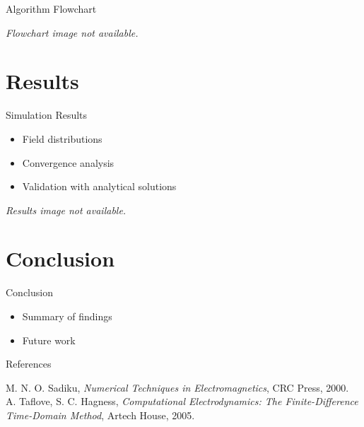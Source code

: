 \documentclass[aspectratio=54,xcolor=dvipsnames]{beamer}
\begin{document}
\begin{frame}{Algorithm Flowchart}
    \begin{center}
        \textit{Flowchart image not available.}
    \end{center}
\end{frame}

\section{Results}
\begin{frame}{Simulation Results}
    \begin{itemize}
        \item Field distributions
        \item Convergence analysis
        \item Validation with analytical solutions
    \end{itemize}
    \begin{center}
        \textit{Results image not available.}
    \end{center}
\end{frame}

\section{Conclusion}
\begin{frame}{Conclusion}
    \begin{itemize}
        \item Summary of findings
        \item Future work
    \end{itemize}
\end{frame}

\begin{frame}{References}
    \footnotesize
    \begin{thebibliography}{99}
         M. N. O. Sadiku, \emph{Numerical Techniques in Electromagnetics}, CRC Press, 2000.
         A. Taflove, S. C. Hagness, \emph{Computational Electrodynamics: The Finite-Difference Time-Domain Method}, Artech House, 2005.
    \end{thebibliography}
\end{frame}
\end{document}
